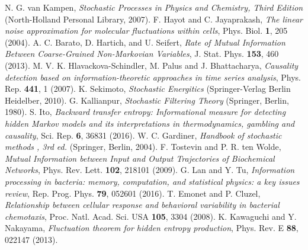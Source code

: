 \documentclass[%
 reprint,
 amsmath,amssymb,
 aps,
]{revtex4-1}
\theoremstyle{plain}
\begin{document}
\begin{thebibliography}{99}
  N. G. van Kampen, {\it Stochastic Processes in Physics and Chemistry, Third Edition} (North-Holland Personal Library, 2007).
  F. Hayot and C. Jayaprakash, {\it The linear noise approximation for molecular fluctuations within cells}, Phys. Biol. {\bf 1}, 205 (2004).
  A. C. Barato, D. Hartich, and U. Seifert, {\it Rate of Mutual Information Between Coarse-Grained Non-Markovian Variables}, J. Stat. Phys. {\bf 153}, 460 (2013).
  M. V. K. Hlavackova-Schindler, M. Palus and J. Bhattacharya, {\it Causality detection based on information-theoretic approaches in
time series analysis}, Phys. Rep. {\bf 441}, 1 (2007).
  K. Sekimoto, {\it Stochastic Energitics} (Springer-Verlag Berlin Heidelber, 2010).
  G. Kallianpur, {\it Stochastic Filtering Theory} (Springer, Berlin, 1980).
  S. Ito, {\it Backward transfer entropy: Informational measure for detecting hidden Markov models and its interpretations in thermodynamics, gambling and causality}, Sci. Rep. {\bf 6}, 36831 (2016).
  W. C. Gardiner, {\it Handbook of stochastic methods , 3rd ed.} (Springer, Berlin, 2004).
  F. Tostevin and P. R. ten Wolde, {\it Mutual Information between Input and Output Trajectories of Biochemical Networks}, Phys. Rev. Lett. {\bf 102}, 218101 (2009).
 G. Lan and Y. Tu, {\it Information processing in bacteria: memory, computation, and statistical physics: a key issues review}, Rep. Prog. Phys. {\bf 79}, 052601 (2016).
  T. Emonet and P. Cluzel, {\it Relationship between cellular response and behavioral variability in bacterial chemotaxis}, Proc. Natl. Acad. Sci. USA {\bf 105}, 3304 (2008).
  K. Kawaguchi and Y. Nakayama, {\it Fluctuation theorem for hidden entropy production}, Phys. Rev. E {\bf 88}, 022147 (2013).
 \end{thebibliography}
\end{document}
